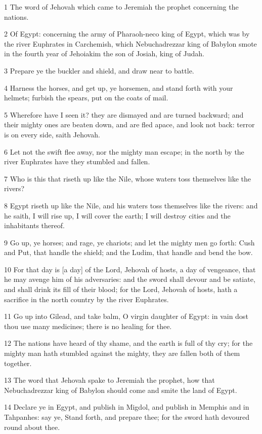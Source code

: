 \par 1 The word of Jehovah which came to Jeremiah the prophet concerning the nations.
\par 2 Of Egypt: concerning the army of Pharaoh-neco king of Egypt, which was by the river Euphrates in Carchemish, which Nebuchadrezzar king of Babylon smote in the fourth year of Jehoiakim the son of Josiah, king of Judah.
\par 3 Prepare ye the buckler and shield, and draw near to battle.
\par 4 Harness the horses, and get up, ye horsemen, and stand forth with your helmets; furbish the spears, put on the coats of mail.
\par 5 Wherefore have I seen it? they are dismayed and are turned backward; and their mighty ones are beaten down, and are fled apace, and look not back: terror is on every side, saith Jehovah.
\par 6 Let not the swift flee away, nor the mighty man escape; in the north by the river Euphrates have they stumbled and fallen.
\par 7 Who is this that riseth up like the Nile, whose waters toss themselves like the rivers?
\par 8 Egypt riseth up like the Nile, and his waters toss themselves like the rivers: and he saith, I will rise up, I will cover the earth; I will destroy cities and the inhabitants thereof.
\par 9 Go up, ye horses; and rage, ye chariots; and let the mighty men go forth: Cush and Put, that handle the shield; and the Ludim, that handle and bend the bow.
\par 10 For that day is [a day] of the Lord, Jehovah of hosts, a day of vengeance, that he may avenge him of his adversaries: and the sword shall devour and be satiate, and shall drink its fill of their blood; for the Lord, Jehovah of hosts, hath a sacrifice in the north country by the river Euphrates.
\par 11 Go up into Gilead, and take balm, O virgin daughter of Egypt: in vain dost thou use many medicines; there is no healing for thee.
\par 12 The nations have heard of thy shame, and the earth is full of thy cry; for the mighty man hath stumbled against the mighty, they are fallen both of them together.
\par 13 The word that Jehovah spake to Jeremiah the prophet, how that Nebuchadrezzar king of Babylon should come and smite the land of Egypt.
\par 14 Declare ye in Egypt, and publish in Migdol, and publish in Memphis and in Tahpanhes: say ye, Stand forth, and prepare thee; for the sword hath devoured round about thee.

